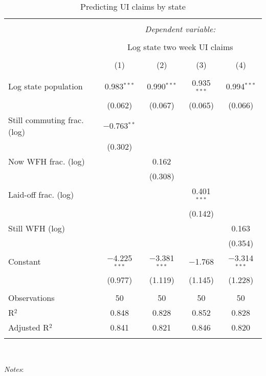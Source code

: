 
\begin{table}[!htbp] \centering 
  \caption{Predicting UI claims by state} 
  \label{tab:ui} 
\small 
\begin{tabular}{@{\extracolsep{5pt}}lcccc} 
\\[-1.8ex]\hline 
\hline \\[-1.8ex] 
 & \multicolumn{4}{c}{\textit{Dependent variable:}} \\ 
\cline{2-5} 
\\[-1.8ex] & \multicolumn{4}{c}{Log state two week UI claims} \\ 
\\[-1.8ex] & (1) & (2) & (3) & (4)\\ 
\hline \\[-1.8ex] 
 Log state population & 0.983$^{***}$ & 0.990$^{***}$ & 0.935$^{***}$ & 0.994$^{***}$ \\ 
  & (0.062) & (0.067) & (0.065) & (0.066) \\ 
  Still commuting frac. (log) & $-$0.763$^{**}$ &  &  &  \\ 
  & (0.302) &  &  &  \\ 
  Now WFH frac. (log) &  & 0.162 &  &  \\ 
  &  & (0.308) &  &  \\ 
  Laid-off frac. (log) &  &  & 0.401$^{***}$ &  \\ 
  &  &  & (0.142) &  \\ 
  Still WFH (log) &  &  &  & 0.163 \\ 
  &  &  &  & (0.354) \\ 
  Constant & $-$4.225$^{***}$ & $-$3.381$^{***}$ & $-$1.768 & $-$3.314$^{***}$ \\ 
  & (0.977) & (1.119) & (1.145) & (1.228) \\ 
 \hline \\[-1.8ex] 
Observations & 50 & 50 & 50 & 50 \\ 
R$^{2}$ & 0.848 & 0.828 & 0.852 & 0.828 \\ 
Adjusted R$^{2}$ & 0.841 & 0.821 & 0.846 & 0.820 \\ 
\hline 
\hline \\[-1.8ex] 
\end{tabular}
\\
\begin{minipage}{1.0 \textwidth}
{\footnotesize \emph{Notes}:
\starlanguage}
\end{minipage}
\end{table}
